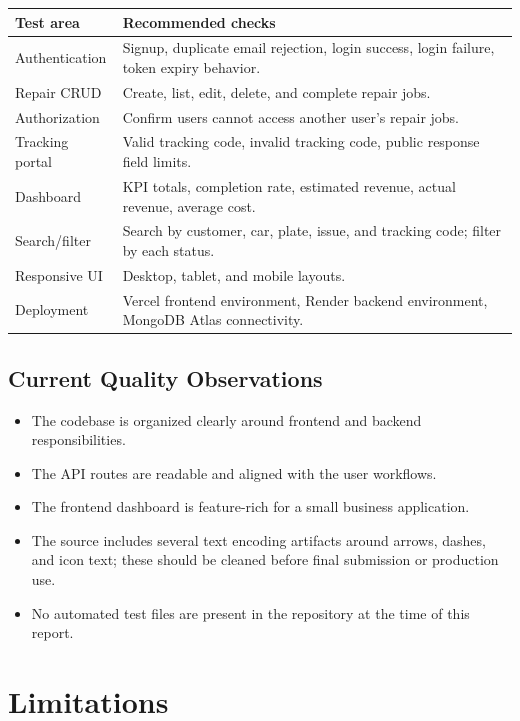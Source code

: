 \documentclass[12pt,a4paper]{report}
\begin{document}
\begin{longtable}{p{}p{}}
\toprule
\textbf{Test area} & \textbf{Recommended checks}\\
\midrule
Authentication & Signup, duplicate email rejection, login success, login failure, token expiry behavior.\\
Repair CRUD & Create, list, edit, delete, and complete repair jobs.\\
Authorization & Confirm users cannot access another user's repair jobs.\\
Tracking portal & Valid tracking code, invalid tracking code, public response field limits.\\
Dashboard & KPI totals, completion rate, estimated revenue, actual revenue, average cost.\\
Search/filter & Search by customer, car, plate, issue, and tracking code; filter by each status.\\
Responsive UI & Desktop, tablet, and mobile layouts.\\
Deployment & Vercel frontend environment, Render backend environment, MongoDB Atlas connectivity.\\
\bottomrule
\end{longtable}

\section{Current Quality Observations}

\begin{itemize}
  \item The codebase is organized clearly around frontend and backend responsibilities.
  \item The API routes are readable and aligned with the user workflows.
  \item The frontend dashboard is feature-rich for a small business application.
  \item The source includes several text encoding artifacts around arrows, dashes, and icon text; these should be cleaned before final submission or production use.
  \item No automated test files are present in the repository at the time of this report.
\end{itemize}

\chapter{Limitations}
\end{document}
